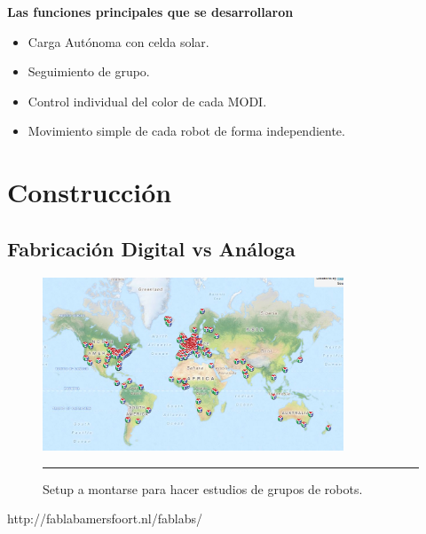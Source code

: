 \textbf{Las funciones principales que se desarrollaron}

\begin{itemize}
\item Carga Autónoma con celda solar.
\item Seguimiento de grupo.
\item Control individual del color de cada MODI.
\item Movimiento simple de cada robot de forma independiente.
\end{itemize}


\section{Construcción}

\subsection{Fabricación Digital vs Análoga}

\begin{figure}[htbp]
	\centering
		\includegraphics[width=0.8\textwidth]{./Figures/map.png}
		\rule{35em}{0.5pt}
	\caption[Setup]{Setup a montarse para hacer estudios de grupos de robots.}
	\label{fig:setup}
\end{figure}

http://fablabamersfoort.nl/fablabs/






